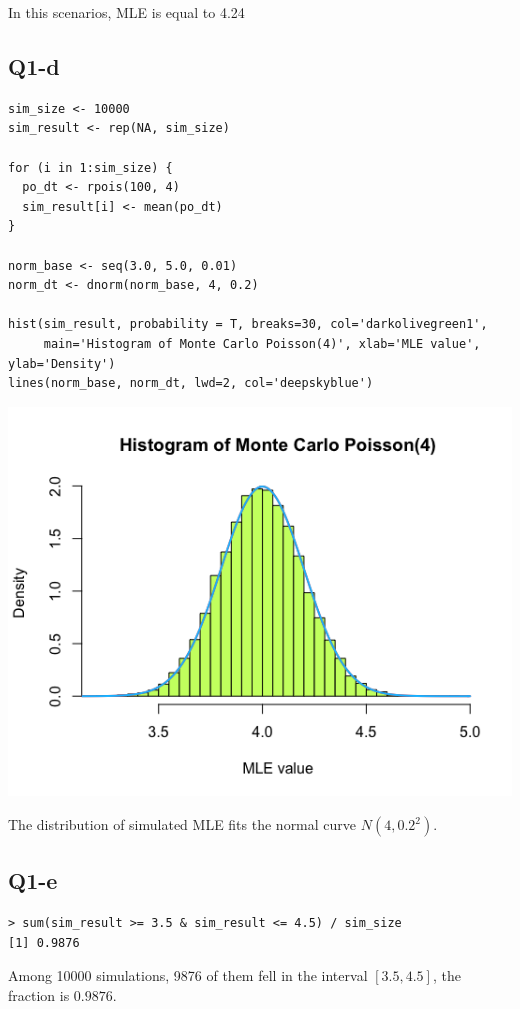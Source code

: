 \documentclass[12pt,letterpaper]{article}
\begin{document}
\noindent In this scenarios, MLE is equal to 4.24

\newpage
\subsection{Q1-d}
\begin{verbatim}
sim_size <- 10000
sim_result <- rep(NA, sim_size)

for (i in 1:sim_size) {
  po_dt <- rpois(100, 4)
  sim_result[i] <- mean(po_dt)
}

norm_base <- seq(3.0, 5.0, 0.01)
norm_dt <- dnorm(norm_base, 4, 0.2)

hist(sim_result, probability = T, breaks=30, col='darkolivegreen1', 
     main='Histogram of Monte Carlo Poisson(4)', xlab='MLE value', ylab='Density')
lines(norm_base, norm_dt, lwd=2, col='deepskyblue')
\end{verbatim}

\includegraphics[width=150mm]{hist_mc.png}

\noindent The distribution of simulated MLE fits the normal curve $N(4, 0.2^2)$.

\newpage
\subsection*{Q1-e}

\begin{verbatim}
> sum(sim_result >= 3.5 & sim_result <= 4.5) / sim_size
[1] 0.9876
\end{verbatim}

\noindent Among 10000 simulations, 9876 of them fell in the interval $[3.5, 4.5]$, the fraction is $0.9876$. \\
\end{document}
